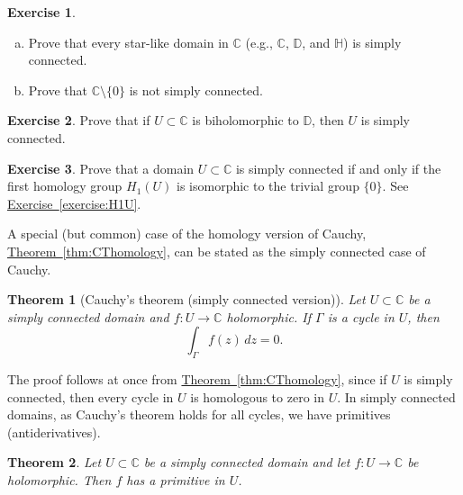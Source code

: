 \documentclass[12pt,openany]{book}
\newcommand{\C}{{\mathbb{C}}}
\newcommand{\D}{{\mathbb{D}}}
\newcommand{\bH}{{\mathbb{H}}}
\theoremstyle{plain}
\newtheorem{thm}{Theorem}[section]
\theoremstyle{remark}
\theoremstyle{definition}
\newenvironment{exbox}{%
    \def\FrameCommand{\vrule width 1pt \relax\hspace{10pt}}%
    \MakeFramed{\advance\hsize-\width\FrameRestore}%
}{%
    \endMakeFramed
}
\newenvironment{exparts}{%
    \leavevmode\begin{enumerate}[a),noitemsep,topsep=0pt,parsep=0pt,partopsep=0pt]
}{%
    \end{enumerate}
}
\theoremstyle{exercise}
\newtheorem{exercise}{Exercise}[section]
\theoremstyle{example}
\newcommand{\exerciseref}[1]{\hyperref[#1]{Exercise~\ref*{#1}}}
\newcommand{\thmref}[1]{\hyperref[#1]{Theorem~\ref*{#1}}}
\begin{document}
\begin{exbox}
\begin{exercise}
\begin{exparts}
\item
Prove that every star-like domain in $\C$
(e.g., $\C$, $\D$, and $\bH$) is simply connected.
\item
Prove that $\C \setminus \{ 0 \}$ is not simply connected.
\end{exparts}
\end{exercise}

\begin{exercise}
Prove that if $U \subset \C$ is biholomorphic to $\D$, then $U$
is simply connected.
\end{exercise}

\begin{exercise}
Prove that a domain $U \subset \C$ is simply connected if and only if
the first homology group
$H_1(U)$ is isomorphic to the trivial group $\{ 0 \}$.
See \exerciseref{exercise:H1U}.
\end{exercise}
\end{exbox}

A special (but common) case of the homology version of Cauchy,
\thmref{thm:CThomology}, can be stated as the simply connected case of Cauchy.

\begin{thm}[Cauchy's theorem (simply connected version)]
%
Let $U \subset \C$ be a simply connected domain and $f \colon U \to \C$
holomorphic.  If $\Gamma$ is a cycle in $U$, then
\begin{equation*}
\int_\Gamma f(z) \, dz = 0 .
\end{equation*}
\end{thm}

The proof follows at once from \thmref{thm:CThomology},
since if $U$ is simply connected, then
every cycle in $U$ is homologous to zero in $U$.
In simply connected domains,
as Cauchy's theorem holds for all cycles,
we have primitives (antiderivatives).

\begin{thm}
Let $U \subset \C$ be a simply connected domain and
let $f \colon U \to \C$ be holomorphic.  Then $f$ has a
primitive in $U$.
\end{thm}
\end{document}
